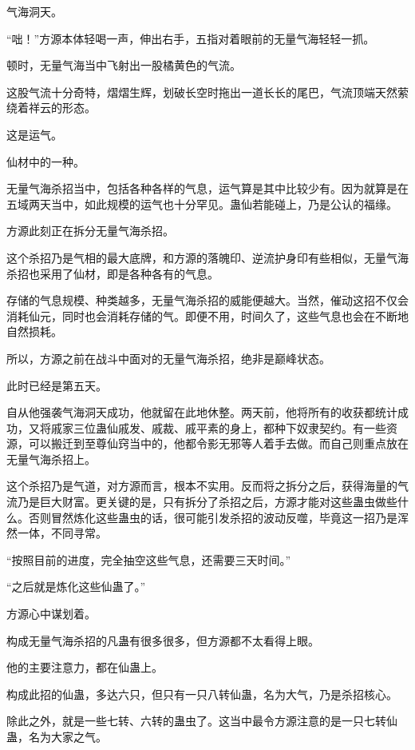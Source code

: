 
\begin{this_body}



气海洞天。

“咄！”方源本体轻喝一声，伸出右手，五指对着眼前的无量气海轻轻一抓。

顿时，无量气海当中飞射出一股橘黄色的气流。

这股气流十分奇特，熠熠生辉，划破长空时拖出一道长长的尾巴，气流顶端天然萦绕着祥云的形态。

这是运气。

仙材中的一种。

无量气海杀招当中，包括各种各样的气息，运气算是其中比较少有。因为就算是在五域两天当中，如此规模的运气也十分罕见。蛊仙若能碰上，乃是公认的福缘。

方源此刻正在拆分无量气海杀招。

这个杀招乃是气相的最大底牌，和方源的落魄印、逆流护身印有些相似，无量气海杀招也采用了仙材，即是各种各有的气息。

存储的气息规模、种类越多，无量气海杀招的威能便越大。当然，催动这招不仅会消耗仙元，同时也会消耗存储的气。即便不用，时间久了，这些气息也会在不断地自然损耗。

所以，方源之前在战斗中面对的无量气海杀招，绝非是巅峰状态。

此时已经是第五天。

自从他强袭气海洞天成功，他就留在此地休整。两天前，他将所有的收获都统计成功，又将戚家三位蛊仙戚发、戚裁、戚平素的身上，都种下奴隶契约。有一些资源，可以搬迁到至尊仙窍当中的，他都令影无邪等人着手去做。而自己则重点放在无量气海杀招上。

这个杀招乃是气道，对方源而言，根本不实用。反而将之拆分之后，获得海量的气流乃是巨大财富。更关键的是，只有拆分了杀招之后，方源才能对这些蛊虫做些什么。否则冒然炼化这些蛊虫的话，很可能引发杀招的波动反噬，毕竟这一招乃是浑然一体，不同寻常。

“按照目前的进度，完全抽空这些气息，还需要三天时间。”

“之后就是炼化这些仙蛊了。”

方源心中谋划着。

构成无量气海杀招的凡蛊有很多很多，但方源都不太看得上眼。

他的主要注意力，都在仙蛊上。

构成此招的仙蛊，多达六只，但只有一只八转仙蛊，名为大气，乃是杀招核心。

除此之外，就是一些七转、六转的蛊虫了。这当中最令方源注意的是一只七转仙蛊，名为大家之气。


\end{this_body}
